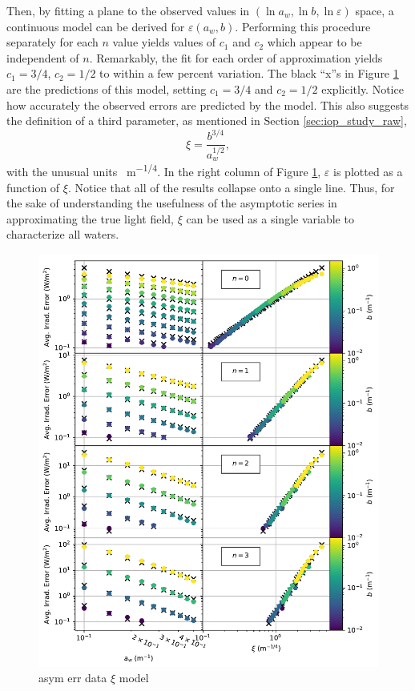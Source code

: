 \documentclass[ms,cpyr,lof,lot]{uathesis}
\begin{document}
Then, by fitting a plane to the observed values in $(\ln a_w, \ln b, \ln \varepsilon)$ space, a continuous model can be derived for $\varepsilon(a_w, b)$.
Performing this procedure separately for each $n$ value yields values of $c_1$ and $c_2$ which appear to be independent of $n$.
Remarkably, the fit for each order of approximation yields $c_1=3/4$, $c_2=1/2$ to within a few percent variation.
The black ``x''s in Figure \ref{fig:asym_err_data_xi_model} are the predictions of this model, setting $c_1=3/4$ and $c_2=1/2$ explicitly.
Notice how accurately the observed errors are predicted by the model.
This also suggests the definition of a third parameter, as mentioned in Section \ref{sec:iop_study_raw},
\begin{equation}
  \xi = \frac{b^{3/4}}{a_w^{1/2}},
\end{equation}
with the unusual units \SI{}{\m^{-1/4}}.
In the right column of Figure \ref{fig:asym_err_data_xi_model}, $\varepsilon$ is plotted as a function of $\xi$.
Notice that all of the results collapse onto a single line.
Thus, for the sake of understanding the usefulness of the asymptotic series in approximating the true light field, $\xi$ can be used as a single variable to characterize all waters.

\begin{figure}[H]
  \centering
  \includegraphics[width=6in]{asym_err_data_xi_model}
  \caption{asym err data $\xi$ model}
  \label{fig:asym_err_data_xi_model}
\end{figure}
\end{document}
